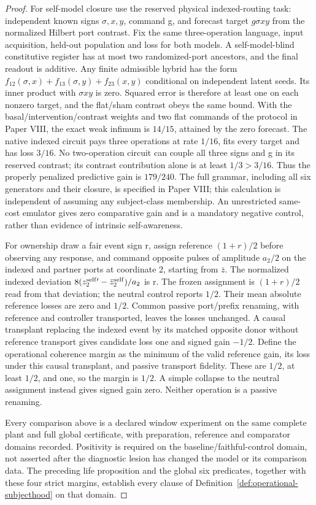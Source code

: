 \documentclass[11pt,a4paper]{article}
\theoremstyle{definition}
\begin{document}
\begin{proof}
For self-model closure use the reserved physical indexed-routing task:
independent known signs $\sigma,x,y$, command g, and forecast target
$g\sigma xy$ from the normalized Hilbert port contrast. Fix the same
three-operation language, input acquisition, held-out population and loss
for both models. A self-model-blind constitutive register has at most two
randomized-port ancestors, and the final readout is additive. Any finite
admissible hybrid has the form
$f_{12}(\sigma,x)+f_{13}(\sigma,y)+f_{23}(x,y)$ conditional on independent
latent seeds. Its inner product with $\sigma xy$ is zero. Squared error is
therefore at least one on each nonzero target, and the flat/sham contrast
obeys the same bound. With the basal/intervention/contrast weights and
two flat commands of the protocol in Paper VIII, the exact weak infimum is
$14/15$, attained by the zero forecast. The native indexed circuit pays
three operations at rate $1/16$, fits every target and has loss $3/16$.
No two-operation circuit can couple all three signs and g in its reserved
contrast; its contrast contribution alone is at least $1/3>3/16$.
Thus the properly penalized predictive gain is $179/240$. The full grammar,
including all six generators and their closure, is specified in Paper VIII;
this calculation is independent of assuming any subject-class membership.
An unrestricted same-cost emulator gives zero comparative gain and is a
mandatory negative control, rather than evidence of intrinsic self-awareness.

For ownership draw a fair event sign r, assign reference $(1+r)/2$ before
observing any response, and command opposite pulses of amplitude $a_2/2$
on the indexed and partner ports at coordinate 2, starting from $\bar z$.
The normalized indexed deviation $8(z_2^{\rm self\prime}-\bar z_2^{\rm self})/a_2$
is r. The frozen assignment is $(1+r)/2$ read from that deviation; the neutral
control reports $1/2$. Their mean absolute reference losses are zero and
$1/2$. Common passive port/prefix renaming, with reference and controller
transported, leaves the losses unchanged. A causal transplant replacing the
indexed event by its matched opposite donor without reference transport gives
candidate loss one and signed gain $-1/2$. Define the operational coherence
margin as the minimum of the valid reference gain, its loss under this causal
transplant, and passive transport fidelity. These are $1/2$, at least $1/2$,
and one, so the margin is $1/2$. A simple collapse to the neutral assignment
instead gives signed gain zero. Neither operation is a passive renaming.

Every comparison above is a declared window experiment on the same complete
plant and full global certificate, with preparation, reference and comparator
domains recorded. Positivity is required on the baseline/faithful-control
domain, not asserted after the diagnostic lesion has changed the model or
its comparison data. The preceding life proposition and the global six
predicates, together with these four strict margins, establish every clause
of Definition~\ref{def:operational-subjecthood} on that domain.
\end{proof}
\end{document}
